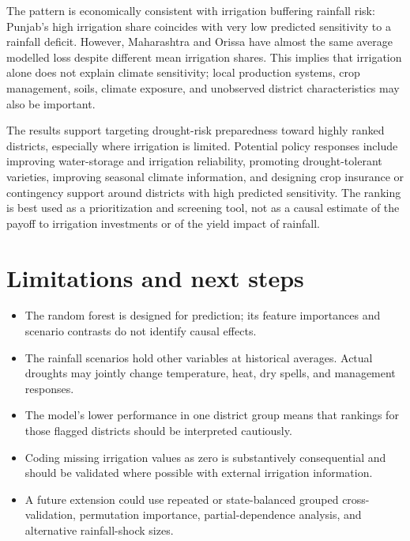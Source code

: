 \documentclass[11pt]{article}
\begin{document}
The pattern is economically consistent with irrigation buffering rainfall risk: Punjab's high irrigation share coincides with very low predicted sensitivity to a rainfall deficit. However, Maharashtra and Orissa have almost the same average modelled loss despite different mean irrigation shares. This implies that irrigation alone does not explain climate sensitivity; local production systems, crop management, soils, climate exposure, and unobserved district characteristics may also be important.

The results support targeting drought-risk preparedness toward highly ranked districts, especially where irrigation is limited. Potential policy responses include improving water-storage and irrigation reliability, promoting drought-tolerant varieties, improving seasonal climate information, and designing crop insurance or contingency support around districts with high predicted sensitivity. The ranking is best used as a prioritization and screening tool, not as a causal estimate of the payoff to irrigation investments or of the yield impact of rainfall.

\section{Limitations and next steps}

\begin{itemize}
    \item The random forest is designed for prediction; its feature importances and scenario contrasts do not identify causal effects.
    \item The rainfall scenarios hold other variables at historical averages. Actual droughts may jointly change temperature, heat, dry spells, and management responses.
    \item The model's lower performance in one district group means that rankings for those flagged districts should be interpreted cautiously.
    \item Coding missing irrigation values as zero is substantively consequential and should be validated where possible with external irrigation information.
    \item A future extension could use repeated or state-balanced grouped cross-validation, permutation importance, partial-dependence analysis, and alternative rainfall-shock sizes.
\end{itemize}
\end{document}
